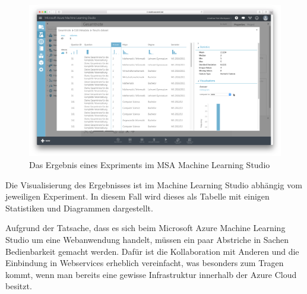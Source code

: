 \begin{figure}[htb]
	\includegraphics[width=\textwidth]{gfx/ml2.png}
	\caption{Das Ergebnis eines Expriments im MSA Machine Learning Studio}
	\label{fig:software:ml:res}
\end{figure}

Die Visualisierung des Ergebnisses ist im Machine Learning Studio abhängig vom
jeweiligen Experiment. In diesem Fall wird dieses als Tabelle mit einigen
Statistiken und Diagrammen dargestellt.


Aufgrund der Tatsache, dass es sich beim Microsoft Azure Machine Learning Studio
um eine Webanwendung handelt, müssen ein paar Abstriche in Sachen Bedienbarkeit
gemacht werden. Dafür ist die Kollaboration mit Anderen und die Einbindung in
Webservices erheblich vereinfacht, was besonders zum Tragen kommt, wenn man
bereits eine gewisse Infrastruktur innerhalb der Azure Cloud besitzt.
